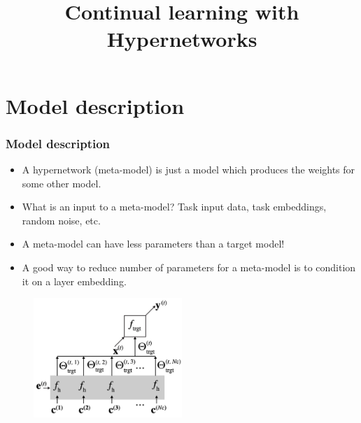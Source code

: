 \documentclass[10pt]{beamer}
\title{Continual learning with Hypernetworks}
\begin{document}
\begin{frame}
    \titlepage
\end{frame}

\section{Model description}
\begin{frame}
    \frametitle{Model description}
    
    \begin{itemize}
        \item\pause A hypernetwork (meta-model) is just a model which produces the weights for some other model.
        \item\pause What is an input to a meta-model? Task input data, task embeddings, random noise, etc.
        \item\pause A meta-model can have less parameters than a target model!
        \item\pause A good way to reduce number of parameters for a meta-model is to condition it on a layer embedding.
    \end{itemize}
    
    \begin{figure}
        \centering
        \includegraphics[width=0.5\textwidth]{images/chuncked-hypernetwork.png}
    \end{figure}
\end{frame}
\end{document}
